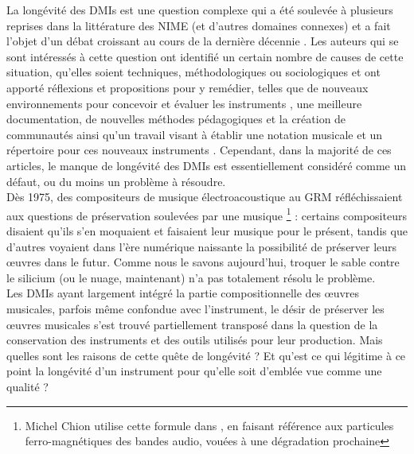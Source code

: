 La longévité des \glspl{DMI} est une question complexe qui a été soulevée à plusieurs reprises dans la littérature des \gls{NIME} (et d'autres domaines connexes) et a fait l'objet d'un débat croissant au cours de la dernière décennie \cite{baguyos_contemporary_2014} \cite{morreale_design_2017} \cite{bonardi_preservation_2008}. Les auteurs qui se sont intéressés à cette question ont identifié un certain nombre de causes de cette situation, qu'elles soient techniques, méthodologiques ou sociologiques et ont apporté réflexions et propositions pour y remédier, telles que de nouveaux environnements pour concevoir et évaluer les instruments \cite{jorda_digital_2004} \cite{morreale_design_2017}, une meilleure documentation, de nouvelles méthodes pédagogiques et la création de communautés ainsi qu'un travail visant à établir une notation musicale et un répertoire pour ces nouveaux instruments \cite{mamedes_composing_2014}\cite{mays_notation_2014}. Cependant, dans la majorité de ces articles, le manque de longévité des \glspl{DMI} est essentiellement considéré comme un défaut, ou du moins un problème à résoudre.\\
\indent Dès 1975, des compositeurs de musique électroacoustique au \gls{GRM} réfléchissaient aux questions de préservation soulevées par une musique \footnote{Michel Chion utilise cette formule dans \cite{chion_musique_1977}, en faisant référence aux particules ferro-magnétiques des bandes audio, vouées à une dégradation prochaine} : certains compositeurs disaient qu'ils s'en moquaient et faisaient leur musique pour le présent, tandis que d'autres voyaient dans l'ère numérique naissante la possibilité de préserver leurs œuvres dans le futur. Comme nous le savons aujourd'hui, troquer le sable contre le silicium (ou le nuage, maintenant) n'a pas totalement résolu le problème.\\
\indent Les \glspl{DMI} ayant largement intégré la partie compositionnelle des œuvres musicales, parfois même confondue avec l'instrument, le désir de préserver les œuvres musicales s'est trouvé partiellement transposé dans la question de la conservation des instruments et des outils utilisés pour leur production. Mais quelles sont les raisons de cette quête de longévité ? Et qu’est ce qui légitime à ce point la longévité d’un instrument pour qu’elle soit d’emblée vue comme une qualité ? 


